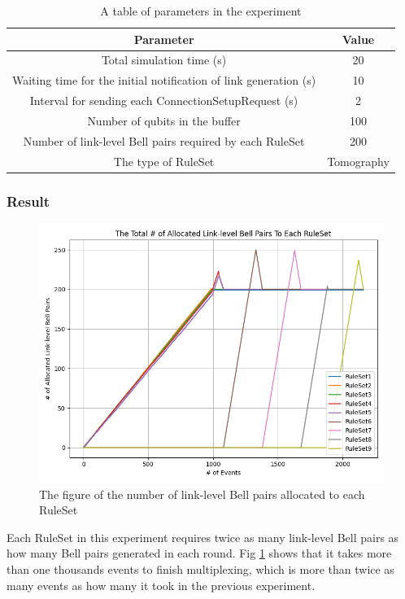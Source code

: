 \begin{table}[ht]
  \begin{center}
    \begin{tabular}{|c|c|} 
      \hline
      Parameter & Value \\ \hline \cline{1-2}
      Total simulation time (s) &  20 \\ \cline{1-2}
      Waiting time for the initial notification of link generation (s) &  10 \\ \cline{1-2} 
      Interval for sending each ConnectionSetupRequest (s) &  2 \\ \cline{1-2} 
      Number of qubits in the buffer & 100  \\  \cline{1-2}
      Number of link-level Bell pairs required by each RuleSet &  200 \\ \cline{1-2}
      The type of RuleSet & Tomography \\  \hline  \cline{1-2}
    \end{tabular}
    \caption{A table of parameters in the experiment}
    \label{table:parameter-for-experiment2}
  \end{center}
\end{table}

\subsubsection{Result}

\begin{figure}[H]
  \centerline{\includegraphics[width=.6\columnwidth]{images/result2.png}}
  \caption{The figure of the number of link-level Bell pairs allocated to each RuleSet}
  \label{fig:result2}
\end{figure}

Each RuleSet in this experiment requires twice as many link-level Bell pairs as how many Bell pairs generated in each round.
Fig \ref{fig:result2} shows that it takes more than one thousands events to finish multiplexing, which is more than twice as many events as how many it took in the previous experiment.


